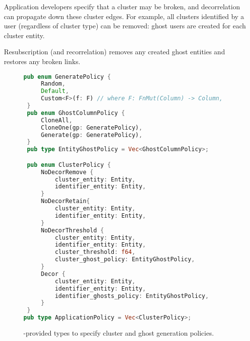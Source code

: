 Application developers specify that a cluster may be broken, and decorrelation can propagate down
these cluster edges.
For example, all clusters identified by a user (regardless of cluster type) can be removed: ghost
users are created for each cluster entity.

Resubscription (and recorrelation) removes any created ghost entities and restores any broken links.


\begin{figure}
\begin{lstlisting}[language=Rust]
 pub enum GeneratePolicy {
     Random,
     Default,
     Custom<F>(f: F) // where F: FnMut(Column) -> Column,
 }
 pub enum GhostColumnPolicy {
     CloneAll,
     CloneOne(gp: GeneratePolicy),
     Generate(gp: GeneratePolicy),
 }
 pub type EntityGhostPolicy = Vec<GhostColumnPolicy>;

 pub enum ClusterPolicy {
     NoDecorRemove {
         cluster_entity: Entity,
         identifier_entity: Entity,
     }
     NoDecorRetain{
         cluster_entity: Entity,
         identifier_entity: Entity,
     }
     NoDecorThreshold {
         cluster_entity: Entity,
         identifier_entity: Entity,
         cluster_threshold: f64,
         cluster_ghost_policy: EntityGhostPolicy,
     }
     Decor {
         cluster_entity: Entity,
         identifier_entity: Entity,
         identifier_ghosts_policy: EntityGhostPolicy,
     }
 }
pub type ApplicationPolicy = Vec<ClusterPolicy>;
\end{lstlisting}
    \caption{\sys{}-provided types to specify cluster and ghost generation policies.}
\end{figure}



